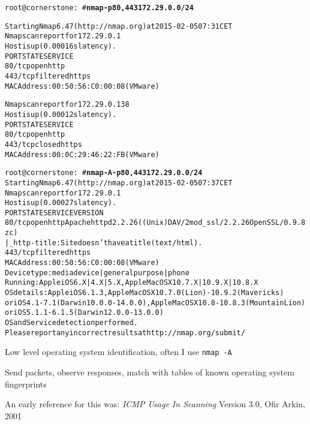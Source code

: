 \documentclass[Screen16to9,17pt]{foils}
\begin{document}

\begin{alltt}\small
root@cornerstone:~#{\bfseries  nmap -p80,443 172.29.0.0/24}

Starting Nmap 6.47 ( http://nmap.org ) at 2015-02-05 07:31 CET
Nmap scan report for 172.29.0.1
Host is up (0.00016s latency).
PORT    STATE    SERVICE
{\color{darkgreen}80/tcp  open     http}
443/tcp filtered https
MAC Address: 00:50:56:C0:00:08 (VMware)

Nmap scan report for 172.29.0.138
Host is up (0.00012s latency).
PORT    STATE  SERVICE
{\color{darkgreen}80/tcp  open   http}
443/tcp closed https
MAC Address: 00:0C:29:46:22:FB (VMware)

\end{alltt}



\begin{alltt}\footnotesize
root@cornerstone:~#{\bfseries nmap -A -p80,443 172.29.0.0/24}
Starting Nmap 6.47 ( http://nmap.org ) at 2015-02-05 07:37 CET
Nmap scan report for 172.29.0.1
Host is up (0.00027s latency).
PORT    STATE    SERVICE VERSION
80/tcp  open     http    Apache httpd 2.2.26 ((Unix) DAV/2 mod_ssl/2.2.26 OpenSSL/0.9.8zc)
|_http-title: Site doesn't have a title (text/html).
443/tcp filtered https
MAC Address: 00:50:56:C0:00:08 (VMware)
Device type: media device|general purpose|phone
Running: Apple iOS 6.X|4.X|5.X, Apple Mac OS X 10.7.X|10.9.X|10.8.X
OS details: Apple iOS 6.1.3, Apple Mac OS X 10.7.0 (Lion) - 10.9.2 (Mavericks)
or iOS 4.1 - 7.1 (Darwin 10.0.0 - 14.0.0), Apple Mac OS X 10.8 - 10.8.3 (Mountain Lion)
or iOS 5.1.1 - 6.1.5 (Darwin 12.0.0 - 13.0.0)
OS and Service detection performed.
Please report any incorrect results at http://nmap.org/submit/
\end{alltt}

\begin{list2}
\item Low level operating system identification, often I use \verb+nmap -A+
\item Send packets, observe responses, match with tables of known operating system fingerprints
\item An early reference for this was: \emph{ICMP Usage In Scanning} Version 3.0,
  Ofir Arkin, 2001 %
\end{list2}
\end{document}
